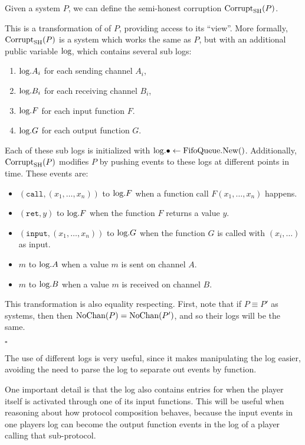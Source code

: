 \begin{definition}
Given a system $P$, we can define
the semi-honest corruption $\text{Corrupt}_{\text{SH}}(P)$.

This is a transformation of
of $P$, providing access to its ``view''.
More formally, $\text{Corrupt}_{\text{SH}}(P)$ is a system which works the same
as $P$, but with an additional public variable $\text{log}$,
which contains several sub logs:
\begin{enumerate}
  \item $\text{log}.{A_i}$ for each sending channel $A_i$,
  \item $\text{log}.{B_i}$ for each receiving channel $B_i$,
  \item $\text{log}.F$ for each input function $F$.
  \item $\text{log}.G$ for each output function $G$.
\end{enumerate}
Each of these sub logs is initialized with ${\text{log}.\bullet \gets \text{FifoQueue.New()}}$.
Additionally, $\text{Corrupt}_{\text{SH}}(P)$ modifies $P$ by pushing events to these
logs at different points in time.
These events are:
\begin{itemize}
\item $(\texttt{call}, (x_1, \ldots, x_n))$ to $\text{log}.F$ when a function call $F(x_1, \ldots, x_n)$ happens.
\item $(\texttt{ret}, y)$ to $\text{log}.F$ when the function $F$ returns a value $y$.
\item $(\texttt{input}, (x_1, \ldots, x_n))$ to $\text{log}.G$ when the function $G$ is called with $(x_i, \ldots)$ as input.
\item $m$ to $\text{log}.A$ when a value $m$ is sent on channel $A$.
\item $m$ to $\text{log}.B$ when a value $m$ is received on channel $B$.
\end{itemize}

This transformation is also equality respecting.
First, note that if $P \equiv P'$ as systems, then
then $\text{NoChan}(P) = \text{NoChan}(P')$, and so their logs will be the same.

$\square$
\end{definition}
The use of different logs is very useful, since it makes manipulating
the log easier, avoiding the need to parse the log to separate
out events by function.

One important detail is that the log also contains entries
for when the player itself is activated through one of its input functions.
This will be useful when reasoning about how protocol composition behaves,
because the input events in one players log can become the output function
events in the log of a player calling that sub-protocol.

